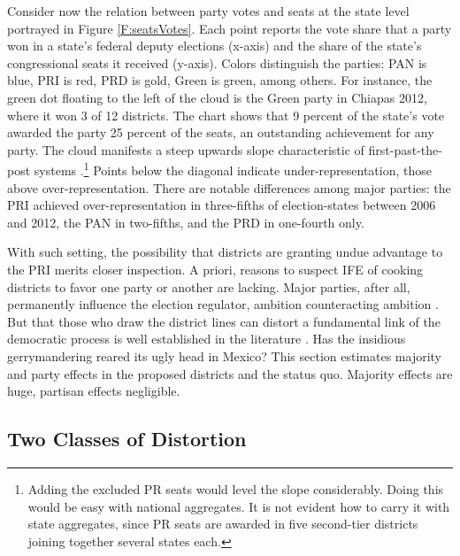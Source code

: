 \documentclass[letter,12pt]{article}
\begin{document}
Consider now the relation between party votes and seats at the state level portrayed in Figure \ref{F:seatsVotes}. Each point reports the vote share that a party won in a state's federal deputy elections (x-axis) and the share of the state's congressional seats it received (y-axis). Colors distinguish the parties: PAN is blue, PRI is red, PRD is gold, Green is green, among others. For instance, the green dot floating to the left of the cloud is the Green party in Chiapas 2012, where it won 3 of 12 districts. The chart shows that 9 percent of the state's vote awarded the party 25 percent of the seats, an outstanding achievement for any party. The cloud manifests a steep upwards slope characteristic of first-past-the-post systems \citep{taagepera.CubeLaw.1973}.\footnote{Adding the excluded PR seats would level the slope considerably. Doing this would be easy with national aggregates. It is not evident how to carry it with state aggregates, since PR seats are awarded in five second-tier districts joining together several states each.} Points below the diagonal indicate under-representation, those above over-representation. There are notable differences among major parties: the PRI achieved over-representation in three-fifths of election-states between 2006 and 2012, the PAN in two-fifths, and the PRD in one-fourth only. 

With such setting, the possibility that districts are granting undue advantage to the PRI merits closer inspection. A priori, reasons to suspect IFE of cooking districts to favor one party or another are lacking. Major parties, after all, permanently influence the election regulator, ambition counteracting ambition \citep{estevez.magar.rosas.2008}. But that those who draw the district lines can distort a fundamental link of the democratic process is well established in the literature \citep{altman.mcdonald2011bard,cox.katz.2002,engstrom2006redisttrictApsr,rossiter.etal.1997,king.1990elRespBiasMultiparty,balinskiYoung2001FairRep,otero.2003}. Has the insidious gerrymandering reared its ugly head in Mexico? This section estimates majority and party effects in the proposed districts and the status quo. Majority effects are huge, partisan effects negligible. 

\subsection{Two Classes of Distortion}
\end{document}
